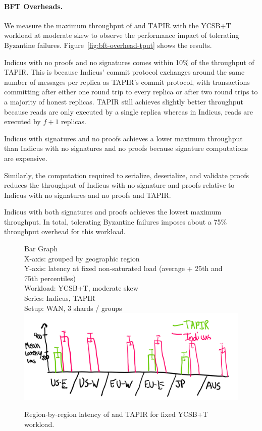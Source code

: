 \paragraph{BFT Overheads.} We measure the maximum throughput of \sys{} and TAPIR with the YCSB+T workload at
moderate skew to observe the performance impact of tolerating Byzantine failures.
Figure~\ref{fig:bft-overhead-tput} shows the results.

Indicus with no proofs and no signatures comes within 10\% of the throughput of
TAPIR. This is because Indicus' commit protocol exchanges around the same
number of messages per replica as TAPIR's commit protocol, with
transactions committing after either one round trip to every replica or after
two round trips to a majority of honest replicas.  TAPIR still achieves slightly
better throughput because reads are only executed by a single replica whereas in
Indicus, reads are executed by $f+1$ replicas.

Indicus with signatures and no proofs achieves a lower maximum throughput than
Indicus with no signatures and no proofs because signature computations are
expensive.

Similarly, the computation required to serialize, deserialize, and validate
proofs reduces the throughput of Indicus with no signature and proofs relative
to Indicus with no signatures and no proofs and TAPIR.

Indicus with both signatures and proofs achieves the lowest maximum throughput.
In total, tolerating Byzantine failures imposes about a 75\% throughput overhead
for this workload.

\begin{figure}
  Bar Graph\\
  X-axis: grouped by geographic region\\
  Y-axis: latency at fixed non-saturated load (average + 25th and 75th percentiles)\\
  Workload: YCSB+T, moderate skew\\
  Series: Indicus, TAPIR\\
  Setup: WAN, 3 shards / groups\\
  \includegraphics[width=\columnwidth]{figures/eval/bft-overhead-lat.png}
  \caption{Region-by-region latency of \sys{} and TAPIR for fixed YCSB+T workload.}
  \label{fig:bft-overhead-lat}
\end{figure}

